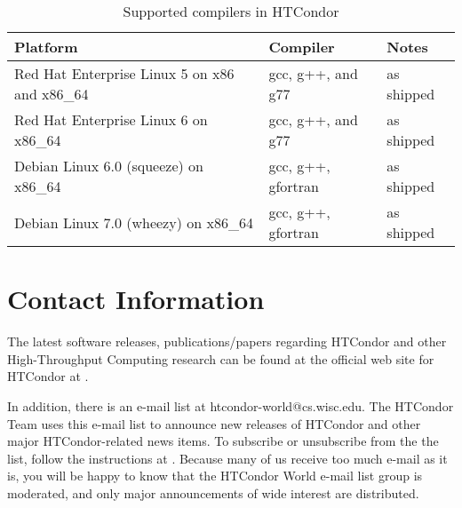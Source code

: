 
\begin{center}
\begin{table}[hbt]
\begin{tabular}{|ll|l|} \hline
\textbf{Platform} & \textbf{Compiler} & \textbf{Notes}\\ \hline \hline
Red Hat Enterprise Linux 5 on x86 and x86\_64 & gcc, g++, and g77 & as shipped  \\ 
\hline
Red Hat Enterprise Linux 6 on x86\_64 & gcc, g++, and g77 & as shipped  \\ 
\hline
Debian Linux 6.0 (squeeze) on x86\_64 & gcc, g++, gfortran & as shipped \\ 
\hline
Debian Linux 7.0 (wheezy) on x86\_64 & gcc, g++, gfortran & as shipped \\ 
\hline
\end{tabular}
\caption{\label{supported-compile}Supported compilers in HTCondor \VersionNotice}
\end{table}
\end{center}

 


\section{\label{contact-info}Contact Information}

The latest software releases, publications/papers regarding HTCondor and other 
High-Throughput Computing
research can be found at the official web site for HTCondor at  
.

In addition, there is an e-mail list at htcondor-world@cs.wisc.edu.
The HTCondor Team uses this e-mail list to announce new releases of
HTCondor and other major HTCondor-related news items.
To subscribe or unsubscribe from the the list, follow the instructions at  
.
Because many of us receive 
too much e-mail as it is, you will be happy to know that the
HTCondor World e-mail list group is 
moderated, and only major announcements of wide interest are distributed.

